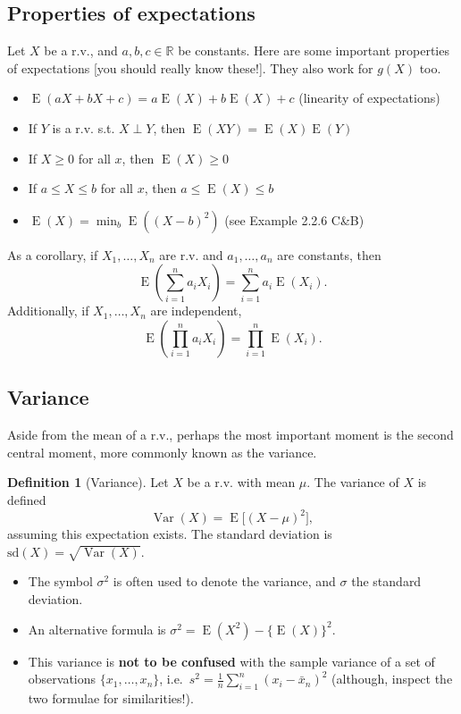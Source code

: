 \documentclass[
]{book}
\providecommand{\tightlist}{%
  \setlength{\itemsep}{0pt}\setlength{\parskip}{0pt}}
\DeclareMathOperator{\E}{E}
\DeclareMathOperator{\Var}{Var}
\newcommand{\bbR}{\mathbb{R}}
\theoremstyle{definition}
\newtheorem{definition}{Definition}[chapter]
\theoremstyle{definition}
\theoremstyle{definition}
\theoremstyle{definition}
\theoremstyle{remark}
\begin{document}
\hypertarget{properties-of-expectations}{%
\subsection{Properties of expectations}\label{properties-of-expectations}}

Let \(X\) be a r.v., and \(a,b,c\in\bbR\) be constants.
Here are some important properties of expectations {[}you should really know these!{]}. They also work for \(g(X)\) too.

\begin{itemize}
\tightlist
\item
  \(\E(aX +bX +c) = a\E(X) + b\E(X) + c\) (linearity of expectations)
\item
  If \(Y\) is a r.v. s.t. \(X\perp Y\), then \(\E(XY) = \E(X)\E(Y)\)
\item
  If \(X\geq 0\) for all \(x\), then \(\E(X)\geq 0\)
\item
  If \(a \leq X \leq b\) for all \(x\), then \(a \leq \E(X) \leq b\)
\item
  \(\E(X) = \min_b \E((X-b)^2)\) (see Example 2.2.6 C\&B)
\end{itemize}

As a corollary, if \(X_1,\dots,X_n\) are r.v. and \(a_1,\dots,a_n\) are constants, then
\[
\E\left(\sum_{i=1}^n a_iX_i \right) = \sum_{i=1}^n a_i\E(X_i).
\]
Additionally, if \(X_1,\dots,X_n\) are independent,
\[
\E\left(\prod_{i=1}^n a_iX_i \right) = \prod_{i=1}^n \E(X_i).
\]

\hypertarget{variance}{%
\subsection{Variance}\label{variance}}

Aside from the mean of a r.v., perhaps the most important moment is the second central moment, more commonly known as the variance.

\begin{definition}[Variance]
Let \(X\) be a r.v. with mean \(\mu\). The variance of \(X\) is defined
\[
\Var(X) = \E\big[(X-\mu)^2\big],
\]
assuming this expectation exists. The standard deviation is \(\text{sd}(X) = \sqrt{\Var(X)}\).
\end{definition}

\begin{itemize}
\tightlist
\item
  The symbol \(\sigma^2\) is often used to denote the variance, and \(\sigma\) the standard deviation.
\item
  An alternative formula is \(\sigma^2 = \E(X^2) - \{\E(X)\}^2\).
\item
  This variance is \textbf{not to be confused} with the sample variance of a set of observations \(\{x_1,\dots,x_n\}\), i.e.~\(s^2 = \frac{1}{n}\sum_{i=1}^n (x_i-\bar x_n)^2\) (although, inspect the two formulae for similarities!).
\end{itemize}
\end{document}
